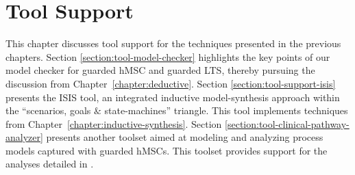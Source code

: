 \chapter{Tool Support\label{chapter:tool-support}}

This chapter discusses tool support for the techniques presented in the previous chapters. Section \ref{section:tool-model-checker} highlights the key points of our model checker for guarded hMSC and guarded LTS, thereby pursuing the discussion from Chapter~\ref{chapter:deductive}. Section \ref{section:tool-support-isis} presents the ISIS tool, an integrated inductive model-synthesis approach within the ``scenarios, goals $\&$ state-machines'' triangle. This tool implements techniques from Chapter~\ref{chapter:inductive-synthesis}. Section \ref{section:tool-clinical-pathway-analyzer} presents another toolset aimed at modeling and analyzing process models captured with guarded hMSCs. This toolset provides support for the analyses detailed in \cite{Damas:2011}.




